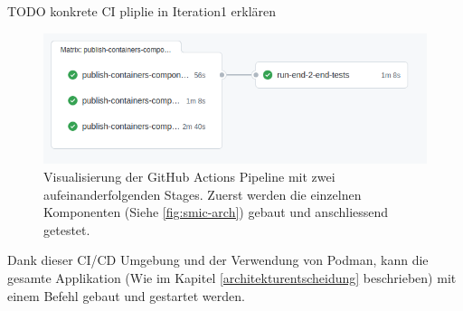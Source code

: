 TODO konkrete CI pliplie in Iteration1 erklären

\begin{figure}[h]
    \centering
    \includegraphics[width=1.0\textwidth]{gfx/ci-env}
    \caption{
        Visualisierung der GitHub Actions Pipeline mit zwei aufeinanderfolgenden Stages.
        Zuerst werden die einzelnen Komponenten (Siehe \ref{fig:smic-arch}) gebaut und
        anschliessend getestet.
    }
    \label{fig:ci-env}
\end{figure}

Dank dieser \ac{CI/CD} Umgebung und der Verwendung von Podman, kann die gesamte Applikation
(Wie im Kapitel \ref{architekturentscheidung} beschrieben) mit einem
Befehl gebaut und gestartet werden.
